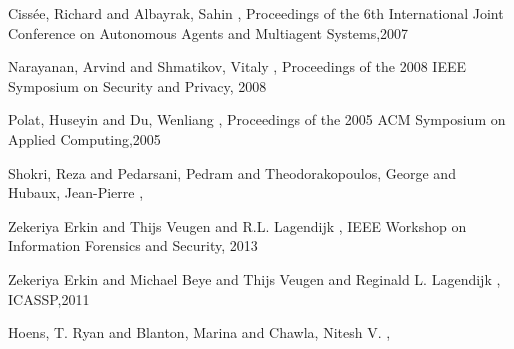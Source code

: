 \documentclass[twocolumn]{phdsymp} %
\begin{document}
%
\begin{thebibliography}{1}

Ciss{\'e}e, Richard and Albayrak, Sahin
,
\newblock Proceedings of the 6th International Joint Conference on Autonomous Agents and Multiagent Systems,2007

Narayanan, Arvind and Shmatikov, Vitaly
,
\newblock Proceedings of the 2008 IEEE Symposium on Security and Privacy, 2008

Polat, Huseyin and Du, Wenliang
,
\newblock Proceedings of the 2005 ACM Symposium on Applied Computing,2005


Shokri, Reza and Pedarsani, Pedram and Theodorakopoulos, George and Hubaux, Jean-Pierre
,

Zekeriya Erkin and Thijs Veugen and R.L. Lagendijk
,
\newblock IEEE Workshop on Information Forensics and Security, 2013

Zekeriya Erkin and Michael Beye and Thijs Veugen and Reginald L. Lagendijk
,
\newblock ICASSP,2011


Hoens, T. Ryan and Blanton, Marina and Chawla, Nitesh V.
,

\end{thebibliography}
%
\end{document}
